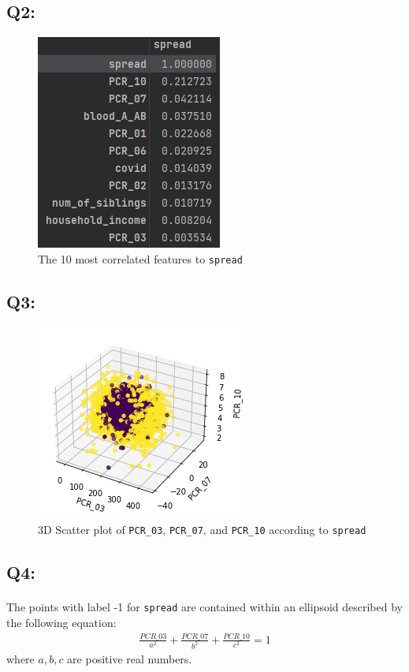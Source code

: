 \documentclass{article}
\newcommand{\code}[1]{\texttt{#1}}
\begin{document}
\subsection*{Q2:}
    \begin{figure}[H]
        \centering
        \includegraphics{images/q2.png}
        \caption{The 10 most correlated features to \code{spread}}
    \end{figure}
\subsection*{Q3:}
    \begin{figure}[H]
        \centering
        \includegraphics{images/q3.png}
        \caption{3D Scatter plot of \code{PCR\_03}, \code{PCR\_07}, and \code{PCR\_10} according to \code{spread}}
    \end{figure}
\subsection*{Q4:}
    \paragraph*{}
    The points with label -1 for \code{spread} are contained within an ellipsoid described by the following equation:
    \begin{align*}
        \frac{PCR\_03}{a^2} + \frac{PCR\_07}{b^2} + \frac{PCR\_10}{c^2} = 1
    \end{align*}
    where $a,b,c$ are positive real numbers.
\end{document}
